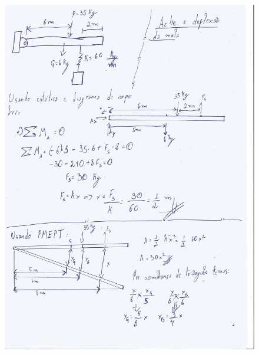 \documentclass{article}
\begin{document}
\begin{figure}[H]
  \centering
  \includegraphics[width=\linewidth]{ResolucaoCasoAnalitico-2.jpg}
\end{figure}%
\end{document}
